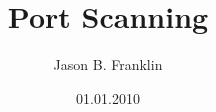 \documentclass[titlepage, a4paper]{article}
\title{Port Scanning}
\author{Jason B. Franklin}
\date{01.01.2010}
\begin{document}
\maketitle
\tableofcontents
\listoffigures


\begin{abstract}
\end{abstract}







\end{document}
